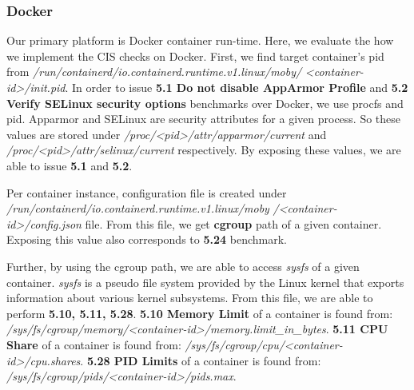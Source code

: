\subsubsection*{Docker}
Our primary platform is Docker container run-time. Here, we evaluate the how we implement the CIS checks on Docker. 
First, we find target container's pid from \textit{/run/containerd/io.containerd.runtime.v1.linux/moby/}
\textit{<container-id>/init.pid}.
In order to issue \textbf{5.1 Do not disable AppArmor Profile} and \textbf{5.2 Verify SELinux security options} benchmarks over Docker, we use procfs and pid. Apparmor and SELinux are security attributes for a given process. So these values are stored under \textit{/proc/<pid>/attr/apparmor/current} and \textit{/proc/<pid>/attr/selinux/current} respectively. By exposing these values, we are able to issue \textbf{5.1} and \textbf{5.2}.

Per container instance, configuration file is created under \textit{/run/containerd/io.containerd.runtime.v1.linux/moby} \textit{/<container-id>/config.json} file. From this file, we get \textbf{cgroup} path of a given container. Exposing this value also corresponds to \textbf{5.24} benchmark.

Further, by using the cgroup path, we are able to access \textit{sysfs} of a given container. \textit{sysfs} is a pseudo file system provided by the Linux kernel that exports information about various kernel subsystems. From this file, we are able to perform \textbf{5.10, 5.11, 5.28}. \textbf{5.10 Memory Limit} of a container is found from: \textit{/sys/fs/cgroup/memory/<container-id>/memory.limit\_in\_bytes}.
\textbf{5.11 CPU Share} of a container is found from: \textit{/sys/fs/cgroup/cpu/<container-id>/cpu.shares}.
\textbf{5.28 PID Limits} of a container is found from: \textit{/sys/fs/cgroup/pids/<container-id>/pids.max}.
 